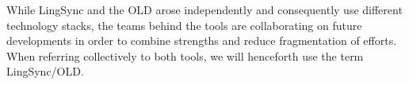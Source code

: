 \documentclass[11pt]{article}
\begin{document}
While LingSync and the OLD arose independently and consequently use different
technology stacks, the teams behind the tools are collaborating on
future developments in order to combine strengths and reduce fragmentation of
efforts. When referring collectively to both tools, we will henceforth use the
term LingSync/OLD.

%
%
%
%
\end{document}
